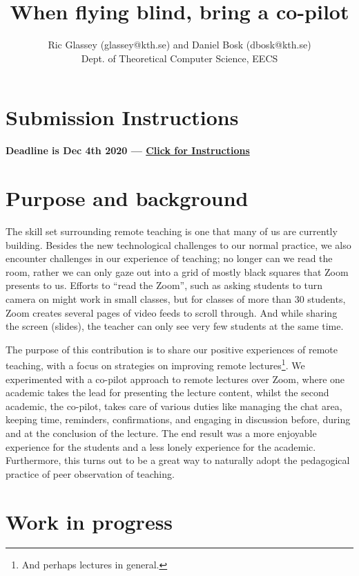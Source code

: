 \documentclass{article}
\title{When flying blind, bring a co-pilot}
\author{Ric Glassey (glassey@kth.se) and Daniel Bosk (dbosk@kth.se)\\
Dept. of Theoretical Computer Science, EECS
}
\date{}
\begin{document}
\maketitle

\section*{Submission Instructions}
\textbf{Deadline is Dec 4th 2020 --- \href{https://intra.kth.se/utbildning/utveckling-och-hogskolepedagogik/kth-sotl/conference-kth/instruktioner-for-bidrag-1.970431}{Click for Instructions}}


\section*{Purpose and background}

The skill set surrounding remote teaching is one that many of us are currently 
building. Besides the new technological challenges to our normal practice, we 
also encounter challenges in our experience of teaching; no longer can we read 
the room, rather we can only gaze out into a grid of mostly black squares that 
Zoom presents to us.
Efforts to \enquote{read the Zoom}, such as asking students to turn camera on 
might work in small classes, but for classes of more than 30 students, Zoom 
creates several pages of video feeds to scroll through.
And while sharing the screen (\eg slides), the teacher can only see very few 
students at the same time.

The purpose of this contribution is to share our positive experiences of remote 
teaching, with a focus on strategies on improving remote lectures\footnote{%
  And perhaps lectures in general.
}.
We experimented with a co-pilot approach to remote lectures over Zoom, where 
one academic takes the lead for presenting the lecture content, whilst the 
second academic, the co-pilot, takes care of various duties like managing the 
chat area, keeping time, reminders, confirmations, and engaging in discussion 
before, during and at the conclusion of the lecture.
The end result was a more enjoyable experience for the students and a less 
lonely experience for the academic.
Furthermore, this turns out to be a great way to naturally adopt the 
pedagogical practice of peer observation of teaching.


\section*{Work in progress}
\end{document}
